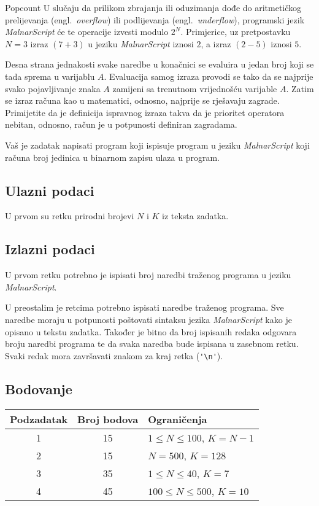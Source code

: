\begin{statement}[
  problempoints=110,
  timelimit=1 sekunda,
  memorylimit=512 MiB,
]{Popcount}
U slučaju da prilikom zbrajanja ili oduzimanja dođe do aritmetičkog
prelijevanja (engl.\ \textit{overflow}) ili podlijevanja (engl.\
\textit{underflow}), programski jezik \textit{MalnarScript} će te operacije
izvesti modulo $2^N$. Primjerice, uz pretpostavku $N=3$ izraz $(7+3)$ u jeziku
\textit{MalnarScript} iznosi $2$, a izraz $(2-5)$ iznosi $5$.

Desna strana jednakosti svake naredbe u konačnici se evaluira u jedan broj koji
se tada sprema u varijablu $A$. Evaluacija samog izraza provodi se tako da se
najprije svako pojavljivanje znaka $A$ zamijeni sa trenutnom vrijednošću
varijable $A$. Zatim se izraz računa kao u matematici, odnosno, najprije se
rješavaju zagrade. Primijetite da je definicija ispravnog izraza takva da je
prioritet operatora nebitan, odnosno, račun je u potpunosti definiran
zagradama.

Vaš je zadatak napisati program koji ispisuje program u jeziku
\textit{MalnarScript} koji računa broj jedinica u binarnom zapisu ulaza u
program.

\subsection*{Ulazni podaci}
U prvom su retku prirodni brojevi $N$ i $K$ iz teksta zadatka.

\subsection*{Izlazni podaci}
U prvom retku potrebno je ispisati broj naredbi traženog programa u jeziku
\textit{MalnarScript}.

U preostalim je retcima potrebno ispisati naredbe traženog programa. Sve
naredbe moraju u potpunosti poštovati sintaksu jezika \textit{MalnarScript}
kako je opisano u tekstu zadatka. Također je bitno da broj ispisanih redaka
odgovara broju naredbi programa te da svaka naredba bude ispisana u zasebnom
retku. Svaki redak mora završavati znakom za kraj retka (\verb|'\n'|).

\subsection*{Bodovanje}
{\renewcommand{\arraystretch}{1.4}
  \setlength{\tabcolsep}{6pt}
  \begin{tabular}{ccl}
 Podzadatak & Broj bodova & Ograničenja \\ \midrule
  1 & 15 & $1 \le N \le 100$, $K = N - 1$ \\
  2 & 15 & $N = 500$, $K = 128$ \\
  3 & 35 & $1 \le N \le 40$, $K=7$ \\
  4 & 45 & $100 \le N \le 500$, $K=10$
\end{tabular}}


\end{statement}
